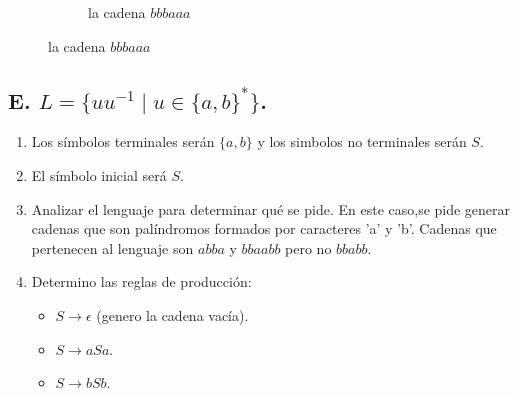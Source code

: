 \documentclass{article}
\begin{document}
\begin{flushleft}
\begin{enumerate}
\begin{figure}[h]
\begin{subfigure}[b]{0.4\textwidth}
                        \caption{la cadena $bbbaaa$}
                        \label{fig:label17}
                    \end{subfigure}
                    \label{fig:matrix4}
                \end{figure}



            \end{enumerate}
        \end{flushleft}
        \newpage %
        \subsection*{E. $L = \{uu^{-1} \mid u \in \{a, b\}^*\}$.}
        \begin{flushleft}
            \begin{enumerate}
                \item Los símbolos terminales serán $\{a,b\}$ y los simbolos no terminales serán $S$.
                \item El símbolo inicial será $S$.
                \item Analizar el lenguaje para determinar qué se pide. En este caso,se pide generar 
                cadenas que son palíndromos formados por caracteres 'a' y 'b'. Cadenas que pertenecen al lenguaje son $abba$ y $bbaabb$ pero no $bbabb$. 
                \item Determino las reglas de producción:
                \begin{itemize}
                    \item $S \rightarrow \epsilon$ (genero la cadena vacía).
                    \item $S \rightarrow aSa$.
                    \item $S \rightarrow bSb$.
                \end{itemize}


\end{enumerate}
\end{flushleft}
\end{document}
